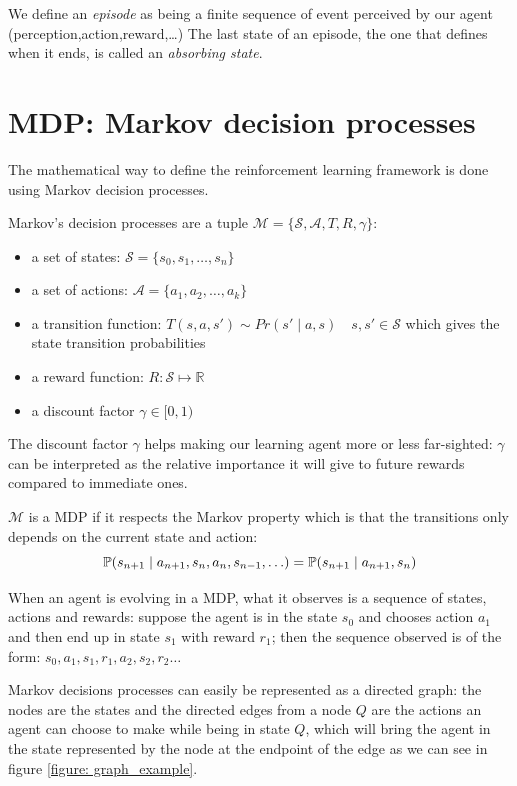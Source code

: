 \documentclass[14pt,a4paper]{article}
\theoremstyle{definition}
\begin{document}
We define an \emph{episode} as being a finite sequence of event perceived by our agent (perception,action,reward,\ldots) The last state of an episode, the one that defines when it ends, is called an \emph{absorbing state}.

\section{MDP: Markov decision processes} \label{def_MDP}



The mathematical way to define the reinforcement learning framework is done using Markov decision processes.

Markov's decision processes are a tuple  $\mathcal{M}=\{\mathcal{S},\mathcal{A},T,R,\gamma\}$: 

\begin{itemize}
\item a set of states: $\mathcal{S}=\{s_0,s_1,\ldots,s_n\}$
\item a set of actions: $\mathcal{A}=\{a_1,a_2,\ldots ,a_k\}$
\item a transition function:  $T(s,a,s') \sim  Pr(s'\mid a, s) \quad s,s' \in \mathcal{S}$ which gives the state transition probabilities
\item a reward function: $R:\mathcal{S}\mapsto \mathbb{R} $
\item a discount factor $\gamma \in [0,1)$
\end{itemize}


The discount factor $\gamma $ helps making our learning agent more or less far-sighted: $\gamma$ can be interpreted as the relative importance it will give to future rewards compared to immediate ones.

$\mathcal{M}$ is a MDP if it respects the Markov property which is that the transitions only depends on the current state and action: 
\begin{equation*}
\mathbb{P}(s_{n+1}\mid a_{n+1},s_{n},a_{n},s_{n-1},\ldots)=\mathbb{P}(s_{n+1}\mid a_{n+1},s_{n})\\
\end{equation*}


When an agent is evolving in a MDP, what it observes is a sequence of states, actions and rewards: suppose the agent is in the state $s_0$ and chooses action $a_1$ and then end up in state $s_1$ with reward $r_1$; then the sequence observed is of the form: $s_0,a_1,s_1,r_1,a_2,s_2,r_2\ldots$


Markov decisions processes can easily be  represented as a directed graph: the nodes are the states and the directed edges from a node $Q$ are the actions an agent can choose to make while being in state $Q$, which will bring the agent in the state represented by the node at the endpoint of the edge as we can see in figure \ref{figure: graph_example}.
\end{document}
